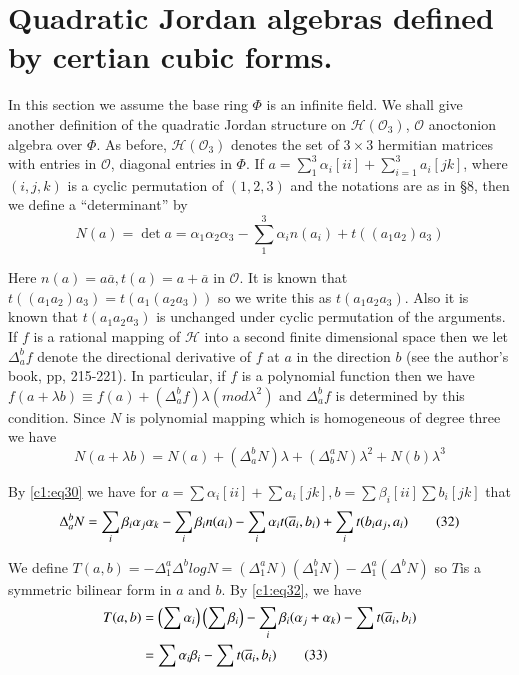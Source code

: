 \section{Quadratic Jordan algebras defined by certian cubic
  forms.}\label{c1:sec9} 

In this section we assume the base ring $\Phi$ is an infinite
field. We shall give another definition of the quadratic Jordan
structure on $\mathscr{H}(\mathcal{O}_3)$, $\mathcal{O}$
an\pageoriginale octonion algebra over $\Phi$. As before,
$\mathscr{H}(\mathcal{O}_3)$ denotes the set of $3\times 3$ hermitian
matrices with entries in $\mathcal{O}$, diagonal entries in $\Phi$. If
$a=\sum\limits_{1}^{3}\alpha_i[ii]+\sum\limits_{i=1}^{3} a_i[jk]$, where
$(i,j,k)$ is a cyclic permutation of $(1,2,3)$ and the notations are
as in \S $8$, then we define a ``determinant'' by
\begin{equation*}
  N(a)=\det  a=\alpha_1\alpha_2\alpha_3-\sum\limits_{1}^{3}
  \alpha_in(a_i)+t((a_1a_2)a_3)\tag{30}\label{c1:eq30}  
\end{equation*}

Here $n(a)=a\overline{a}, t(a)=a+\overline{a}$ in $\mathcal{O}$. It is
known that $t((a_1a_2)a_3)=t(a_1(a_2 a_3))$ so we write this as
$t(a_1a_2a_3)$. Also it is known that $t(a_1a_2a_3)$ is unchanged
under cyclic permutation of the arguments. If $f$ is a rational
mapping of $\mathscr{H}$ into a second finite dimensional space then
we let $\Delta^{b}_af$ denote the directional derivative of $f$ at $a$
in the direction $b$ (see the author's book, pp, 215-221). In
particular, if $f$ is a polynomial function then we have $f(a+\lambda
b)\equiv f(a)+(\Delta_a^{b}f)\lambda (mod \lambda^{2})$ and
$\Delta_{a}^{b}f$ is determined by this condition. Since $N$ is
polynomial mapping which is homogeneous of degree three we have
\begin{equation*}
N(a+\lambda b)=N(a)+(\Delta_a^{b}N)\lambda + (\Delta_b^{a} N)
\lambda^{2}+N(b)\lambda^{3}\tag{31}\label{c1:eq31} 
\end{equation*}

By \eqref{c1:eq30} we have for $a=\sum \alpha_i [ii]+\sum a_i [jk], b=\sum
\beta_i[ii]\sum b_i [jk]$ that
\begin{equation*}
  \Delta_a^{b}N=\sum\limits_i\beta_i\alpha_j\alpha_k-\sum\limits_{i}\beta_i
  n(a_i)-\sum\limits_i\alpha_i t(\overline{a}_{i},b_i)+\sum\limits_{i}
  t(b_i a_j, a_i)\tag{32}\label{c1:eq32}
\end{equation*}

We define $T(a, b)=-\Delta_{1}^{a}\Delta^{b}log
N=(\Delta_{1}^{a}N) (\Delta_{1}^{b} N)-\Delta_{1}^{a}(\Delta^{b} N)$ so
$T$\pageoriginale is a symmetric bilinear form in $a$ and $b$. By
\eqref{c1:eq32}, we have
\begin{align*}
  T(a,b)&=\left(\sum\alpha_i\right) \left(\sum\beta_i\right) -
  \sum\limits_i\beta_i(\alpha_j+\alpha_k)-\sum 
  t(\overline{a}_i,b_i)\\
&=\sum \alpha_i\beta_i-\sum t(\overline{a}_i,b_i)\tag{33}\label{c1:eq33}
\end{align*}

